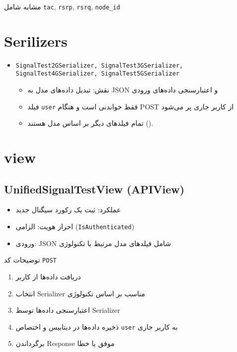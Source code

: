\documentclass{report}
\begin{document}
\subsubsection{}
مشابه  شامل \texttt{tac}, \texttt{rsrp}, \texttt{rsrq}, \texttt{node\_id}

\section{Serilizers}
\begin{itemize}
    \item \texttt{SignalTest2GSerializer, SignalTest3GSerializer, SignalTest4GSerializer, SignalTest5GSerializer}
    \begin{itemize}
        \item نقش: تبدیل داده‌های مدل به JSON و اعتبارسنجی داده‌های ورودی
        \item فیلد \texttt{user} فقط خواندنی است و هنگام POST از کاربر جاری پر می‌شود
        \item تمام فیلدهای دیگر بر اساس مدل هستند (\texttt{}).
    \end{itemize}
\end{itemize}

\section{view}
\subsection{UnifiedSignalTestView (APIView)}
\texttt{}
\begin{itemize}
    \item عملکرد: ثبت یک رکورد سیگنال جدید
    \item احراز هویت: الزامی (\texttt{IsAuthenticated})
    \item ورودی: JSON شامل فیلدهای مدل مرتبط با تکنولوژی
\end{itemize}

  توضیحات کد   \texttt{POST}
\begin{enumerate}
    \item دریافت داده‌ها از کاربر
    \item انتخاب Serializer مناسب بر اساس تکنولوژی
    \item اعتبارسنجی داده‌ها توسط Serializer
    \item ذخیره داده‌ها در دیتابیس و اختصاص \texttt{user} به کاربر جاری
    \item برگرداندن Response موفق  یا خطا 
\end{enumerate}
\end{document}
